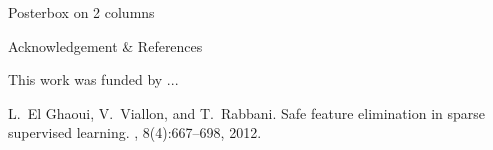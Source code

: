 \documentclass[landscape, a0paper]{baposter}
\makeatletter
\def\neutralisetitre{\def\section{\@ifstar\@gobble\@gobble}}
\makeatother
\begin{document}
\begin{poster}
\begin{posterbox}[name=name3, column=1, span=2, below=intro
                  ]{Posterbox on 2 columns}
\end{posterbox}

\begin{posterbox}[name=references, column=1, span=2, below=expe, below=intro,
                  below=name3, bottomaligned=notation]{Acknowledgement \& References}
\neutralisetitre

{\small{}
This work was funded by ...

\begin{thebibliography}{1}

L.~{El Ghaoui}, V.~Viallon, and T.~Rabbani.
\newblock Safe feature elimination in sparse supervised learning.
, 8(4):667--698, 2012.
\\[-0.5cm]

\end{thebibliography}
}
\end{posterbox}

\end{poster}
\end{document}
